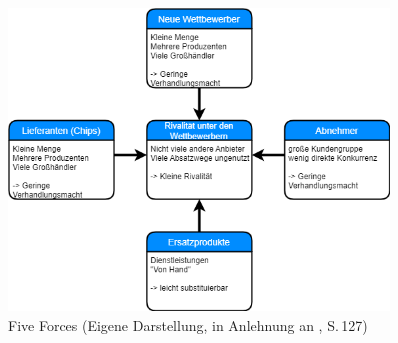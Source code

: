     \begin{figure}[ht]
        \centering
        \includegraphics[width = 0.9\textwidth]{Eigene Darstellungen/Distributionswege2.png}

        \caption{Five Forces (Eigene Darstellung, in Anlehnung an \cite{Gamayanto2005}, S.\,127)}
    \end{figure}

